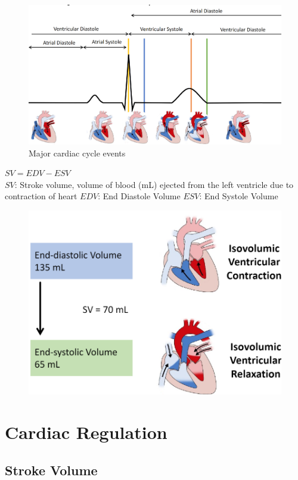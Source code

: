 \documentclass[11pt,fleqn]{book} %
\begin{document}
\begin{figure}[h!]
\begin{center}
    \includegraphics[width=0.65\linewidth]{Pictures/Screenshot 2024-04-04 001715.png}
    \caption{Major cardiac cycle events}
\end{center}
\end{figure}

\begin{theorem}
    $SV=EDV-ESV$\\
    $SV$: Stroke volume,  volume of blood (mL)
ejected from the left ventricle
due to contraction of heart
    $EDV$: End Diastole Volume
    $ESV$: End Systole Volume
\end{theorem}

\begin{figure}[h!]
\begin{center}
    \includegraphics[width=0.6\linewidth]{Pictures/Screenshot 2024-04-04 001818.png}
    \caption{}
\end{center}
\end{figure}

\newpage
\section{Cardiac Regulation}
\subsection{Stroke Volume}
\end{document}
